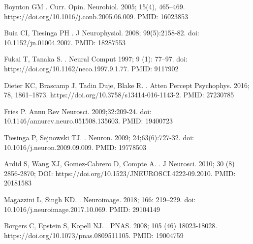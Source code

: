 \documentclass[10pt,letterpaper]{article}
\begin{document}
\begin{thebibliography}{10}
Boynton GM
.
\newblock Curr. Opin. Neurobiol. 2005; 15(4), 465–469. https://doi.org/10.1016/j.conb.2005.06.009. PMID: 16023853

Buia CI, Tiesinga PH
.
\newblock J Neurophysiol. 2008; 99(5):2158-82. doi: 10.1152/jn.01004.2007. PMID: 18287553

Fukai T, Tanaka S.
.
\newblock Neural Comput 1997; 9 (1): 77–97. doi: https://doi.org/10.1162/neco.1997.9.1.77. PMID: 9117902

Dieter KC, Brascamp J, Tadin Duje, Blake R.
.
\newblock Atten Percept Psychophys. 2016; 78, 1861–1873. https://doi.org/10.3758/s13414-016-1143-2. PMID: 27230785


Fries P.
\newblock Annu Rev Neurosci. 2009;32:209-24. doi: 10.1146/annurev.neuro.051508.135603. PMID: 19400723


Tiesinga P, Sejnowski TJ.
.
\newblock Neuron. 2009; 24;63(6):727-32. doi: 10.1016/j.neuron.2009.09.009. PMID: 19778503


Ardid S, Wang XJ, Gomez-Cabrero D, Compte A.
.
\newblock J Neurosci. 2010; 30 (8) 2856-2870; DOI: https://doi.org/10.1523/JNEUROSCI.4222-09.2010. PMID: 20181583


Magazzini L, Singh KD.
.
\newblock Neuroimage. 2018; 166: 219–229. doi: 10.1016/j.neuroimage.2017.10.069. PMID: 29104149

B$\ddot{o}$rgers C, Epstein S, Kopell NJ.
.
\newblock PNAS. 2008; 105 (46) 18023-18028. https://doi.org/10.1073/pnas.0809511105. PMID: 19004759


\end{thebibliography}
\end{document}
